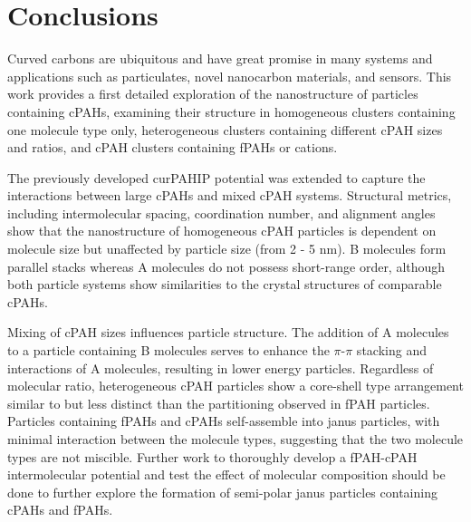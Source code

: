 %

\section{Conclusions}
Curved carbons are ubiquitous and have great promise in many systems and applications such as particulates, novel nanocarbon materials, and sensors. This work provides a first detailed exploration of the nanostructure of particles containing cPAHs, examining their structure in homogeneous clusters containing one molecule type only, heterogeneous clusters containing different cPAH sizes and ratios, and cPAH clusters containing fPAHs or cations.

The previously developed curPAHIP potential was extended to capture the interactions between large cPAHs and mixed cPAH systems. Structural metrics, including intermolecular spacing, coordination number, and alignment angles show that the nanostructure of homogeneous cPAH particles is dependent on molecule size but unaffected by particle size (from 2 - 5 nm). B molecules form parallel stacks whereas A molecules do not possess short-range order, although both particle systems show similarities to the crystal structures of comparable cPAHs.

Mixing of cPAH sizes influences particle structure. The addition of A molecules to a particle containing B molecules serves to enhance the $\pi$-$\pi$ stacking and interactions of A molecules, resulting in lower energy particles. Regardless of molecular ratio, heterogeneous cPAH particles show a core-shell type arrangement similar to but less distinct than the partitioning observed in fPAH particles. Particles containing fPAHs and cPAHs self-assemble into janus particles, with minimal interaction between the molecule types, suggesting that the two molecule types are not miscible. Further work to thoroughly develop a fPAH-cPAH intermolecular potential and test the effect of molecular composition should be done to further explore the formation of semi-polar janus particles containing cPAHs and fPAHs. 

